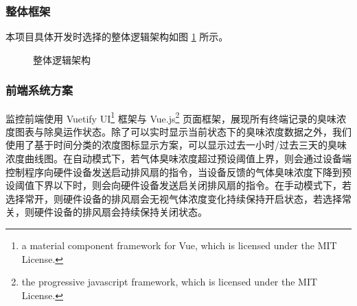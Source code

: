 \documentclass[UTF8]{ctexart}
\begin{document}
\subsubsection{整体框架}
本项目具体开发时选择的整体逻辑架构如图 \ref{fig:diagram2} 所示。
\begin{figure}[h]
    \noindent{}
    \caption{整体逻辑架构}\label{fig:diagram2}
\end{figure}


\subsubsection{前端系统方案}
监控前端使用 Vuetify UI\footnote{a material component framework for Vue, which is licensed under the MIT License.} 框架与 Vue.js\footnote{the progressive javascript framework, which is licensed under the MIT License.} 页面框架，展现所有终端记录的臭味浓度图表与除臭运作状态。除了可以实时显示当前状态下的臭味浓度数据之外，我们使用了基于时间分类的浓度图标显示方案，可以显示过去一小时/过去三天的臭味浓度曲线图。在自动模式下，若气体臭味浓度超过预设阈值上界，则会通过设备端控制程序向硬件设备发送启动排风扇的指令，当设备反馈的气体臭味浓度下降到预设阈值下界以下时，则会向硬件设备发送启关闭排风扇的指令。在手动模式下，若选择常开，则硬件设备的排风扇会无视气体浓度变化持续保持开启状态，若选择常关，则硬件设备的排风扇会持续保持关闭状态。
\end{document}
